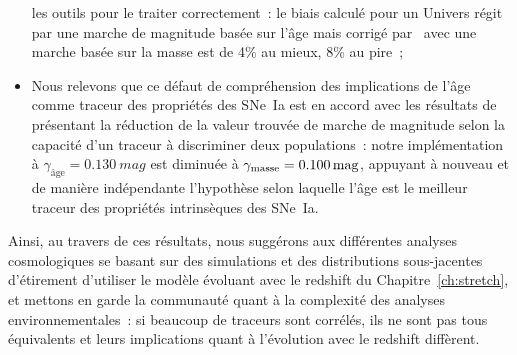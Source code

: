 \documentclass[../main/main.tex]{subfiles}
\begin{document}
\begin{itemize}
        les outils pour le traiter correctement~: le biais calculé pour un
        Univers régit par une marche de magnitude basée sur l'âge mais corrigé
        par \snana\ avec une marche basée sur la masse est de 4\% au mieux, 8\%
        au pire~;
    \item Nous relevons que ce défaut de compréhension des implications de l'âge
        comme traceur des propriétés des SNe~Ia est en accord avec les résultats
        de~\cite{briday2021, briday2022} présentant la réduction de la valeur
        trouvée de marche de magnitude selon la capacité d'un traceur à
        discriminer deux populations~: notre implémentation à $\gamma_\text{âge}
        = \SI{0.130}{mag}$ est diminuée à $\gamma_{\rm masse} =
        \SI{0.100}{mag}$, appuyant à nouveau et de manière indépendante
        l'hypothèse selon laquelle l'âge est le meilleur traceur des propriétés
        intrinsèques des SNe~Ia.
\end{itemize}

Ainsi, au travers de ces résultats, nous suggérons aux différentes analyses
cosmologiques se basant sur des simulations et des distributions sous-jacentes
d'étirement d'utiliser le modèle évoluant avec le redshift du
Chapitre~\ref{ch:stretch}, et mettons en garde la communauté quant à la
complexité des analyses environnementales~: si beaucoup de traceurs sont
corrélés, ils ne sont pas tous équivalents et leurs implications quant à
l'évolution avec le redshift diffèrent. 

% 
% 
\end{document}
